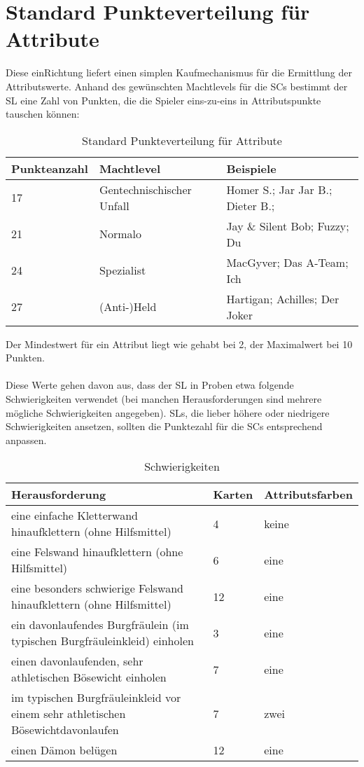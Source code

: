 \section{Standard Punkteverteilung für Attribute}
\label{sect:StandardPunkteverteilungfuerAttribute}
Diese einRichtung liefert einen simplen Kaufmechanismus für die Ermittlung der Attributswerte. Anhand des gewünschten Machtlevels für die SCs bestimmt der SL eine Zahl von Punkten, die die Spieler eins-zu-eins in Attributspunkte tauschen können:
\begin{table}[H]
\caption{Standard Punkteverteilung für Attribute}
\begin{tabular}{|l|l|l|}
\hline
Punkteanzahl & Machtlevel & Beispiele \\
\hline
17 & Gentechnischischer Unfall & Homer S.; Jar Jar B.; Dieter B.;\\
21 & Normalo & Jay \& Silent Bob; Fuzzy; Du\\
24 & Spezialist & MacGyver; Das A-Team; Ich\\
27 & (Anti-)Held & Hartigan; Achilles; Der Joker\\
\hline
\end{tabular}
\end{table}
Der Mindestwert für ein Attribut liegt wie gehabt bei 2, der Maximalwert bei 10 Punkten. 
\\
\\
Diese Werte gehen davon aus, dass der SL in Proben etwa folgende Schwierigkeiten verwendet (bei manchen Herausforderungen sind mehrere mögliche Schwierigkeiten angegeben). SLs, die lieber höhere oder niedrigere Schwierigkeiten ansetzen, sollten die Punktezahl für die SCs entsprechend anpassen.
\begin{table}[H]
\caption{Schwierigkeiten}
\begin{tabular}{|p{10cm}|l|l|}
\hline
Herausforderung & Karten & Attributsfarben \\
\hline
eine einfache Kletterwand hinaufklettern (ohne Hilfsmittel) & 4 & keine\\
eine Felswand hinaufklettern (ohne Hilfsmittel) & 6 & eine\\
eine besonders schwierige Felswand hinaufklettern (ohne Hilfsmittel) & 	12 & eine\\
ein davonlaufendes Burgfräulein (im typischen Burgfräuleinkleid) einholen & 3 & eine\\
einen davonlaufenden, sehr athletischen Bösewicht einholen & 7 & eine\\
im typischen Burgfräuleinkleid vor einem sehr athletischen Bösewichtdavonlaufen & 7 & zwei\\
einen Dämon belügen & 12 & eine\\
\hline
\end{tabular}
\end{table}
